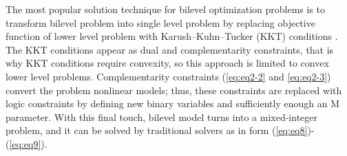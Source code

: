 \documentclass[12pt]{article}
\begin{document}
The most popular solution technique for bilevel optimization problems is to transform bilevel problem into single level problem by replacing objective function of lower level problem with Karush–Kuhn–Tucker (KKT) conditions \cite{Bard1998PracticalBO}. The KKT conditions appear as dual and complementarity constraints, that is why KKT conditions require convexity, so this approach is limited to convex lower level problems. Complementarity constraints (\ref{eq:eq2-2} and \ref{eq:eq2-3})  convert the problem nonlinear models; thus, these constraints are replaced with logic constraints by defining new binary variables and sufficiently enough an M parameter. With this final touch, bilevel model turns into a mixed-integer problem, and it can be solved by traditional solvers as in form (\ref{eq:eq8})-(\ref{eq:eq9}).\\
\end{document}
